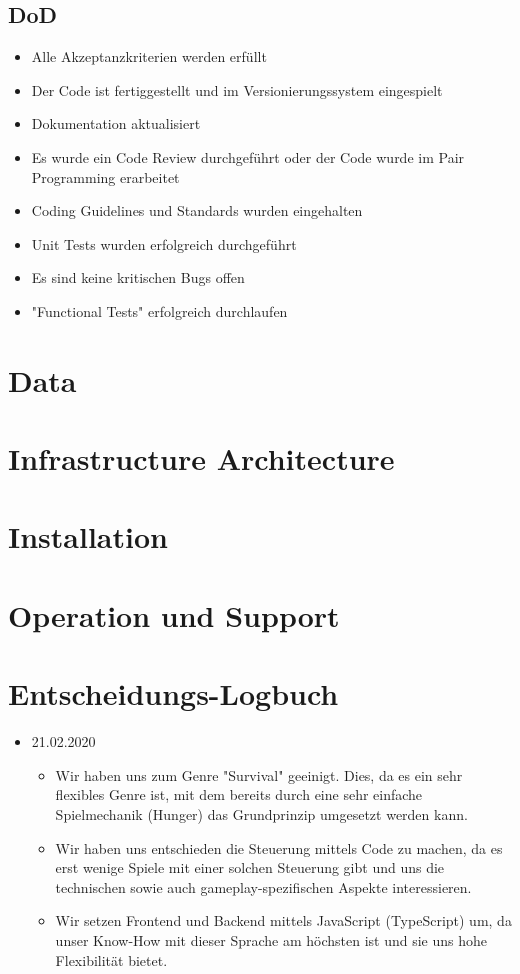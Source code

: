 \documentclass[a4paper, 11pt]{scrartcl}
\let\oldsection\section
\renewcommand\section{\clearpage\oldsection}
\begin{document}
\subsection{DoD}
\begin{itemize}
\item Alle Akzeptanzkriterien werden erfüllt
\item Der Code ist fertiggestellt und im Versionierungssystem eingespielt
\item Dokumentation aktualisiert
\item Es wurde ein Code Review durchgeführt oder der Code wurde im Pair Programming erarbeitet
\item Coding Guidelines und Standards wurden eingehalten
\item Unit Tests wurden erfolgreich durchgeführt 
\item Es sind keine kritischen Bugs offen
\item "Functional Tests" erfolgreich durchlaufen
\end{itemize}
\section{Data}

\section{Infrastructure Architecture}

\section{Installation}

\section{Operation und Support}

\section{Entscheidungs-Logbuch}

\begin{itemize}
  \item 21.02.2020
  \begin{itemize}
    \item Wir haben uns zum Genre "Survival" geeinigt. Dies, da es ein sehr flexibles Genre ist, mit dem bereits durch eine sehr einfache Spielmechanik (Hunger) das Grundprinzip umgesetzt werden kann.
    \item Wir haben uns entschieden die Steuerung mittels Code zu machen, da es erst wenige Spiele mit einer solchen Steuerung gibt und uns die technischen sowie auch gameplay-spezifischen Aspekte interessieren.
    \item Wir setzen Frontend und Backend mittels JavaScript (TypeScript) um, da unser Know-How mit dieser Sprache am höchsten ist und sie uns hohe Flexibilität bietet.
  \end{itemize}
\end{itemize}

\clearpage

\printglossary[type=\acronymtype]

\printglossary
\end{document}
